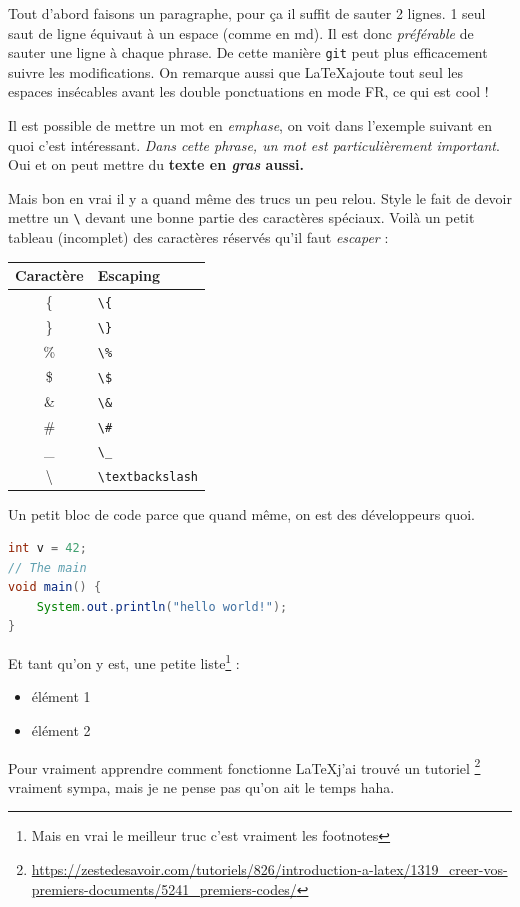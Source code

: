 \documentclass[french]{article}
\begin{document}
Tout d'abord faisons un paragraphe, pour ça il suffit de sauter 2 lignes.
1 seul saut de ligne équivaut à un espace (comme en md).
Il est donc \emph{préférable} de sauter une ligne à chaque phrase.
De cette manière \lstinline{git} peut plus efficacement suivre les modifications.
On remarque aussi que \LaTeX ajoute tout seul les espaces insécables avant les double ponctuations en mode FR, ce qui est cool !

Il est possible de mettre un mot en \emph{emphase}, on voit dans l'exemple suivant en quoi c'est intéressant.
\textit{Dans cette phrase, un mot est \emph{particulièrement} important}.
Oui et on peut mettre du \textbf{texte en \emph{gras} aussi.}

Mais bon en vrai il y a quand même des trucs un peu relou.
Style le fait de devoir mettre un \lstinline{\} devant une bonne partie des caractères spéciaux.
Voilà un petit tableau (incomplet) des caractères réservés qu'il faut \emph{escaper} :

\begin{tabular}{ c l }
	Caractère & Escaping \\
	\hline
	\{ & \verb|\{| \\
	\} & \verb|\}| \\
	\% & \verb|\%| \\
	\$ & \verb|\$| \\
	\& & \verb|\&| \\
	\# & \verb|\#| \\
	\_ & \verb|\_| \\
	\textbackslash & \verb|\textbackslash|
\end{tabular}

\newpage
Un petit bloc de code parce que quand même, on est des développeurs quoi.
\begin{lstlisting}[language=java]
int v = 42;
// The main
void main() {
	System.out.println("hello world!");
}
\end{lstlisting}

Et tant qu'on y est, une petite liste\footnote{Mais en vrai le meilleur truc c'est vraiment les footnotes} :
\begin{itemize}
	\item élément 1
	\item élément 2
\end{itemize}

Pour vraiment apprendre comment fonctionne \LaTeX j'ai trouvé un tutoriel
\footnote{\raggedright\url{https://zestedesavoir.com/tutoriels/826/introduction-a-latex/1319_creer-vos-premiers-documents/5241_premiers-codes/}}
vraiment sympa, mais je ne pense pas qu'on ait le temps haha.
\end{document}
